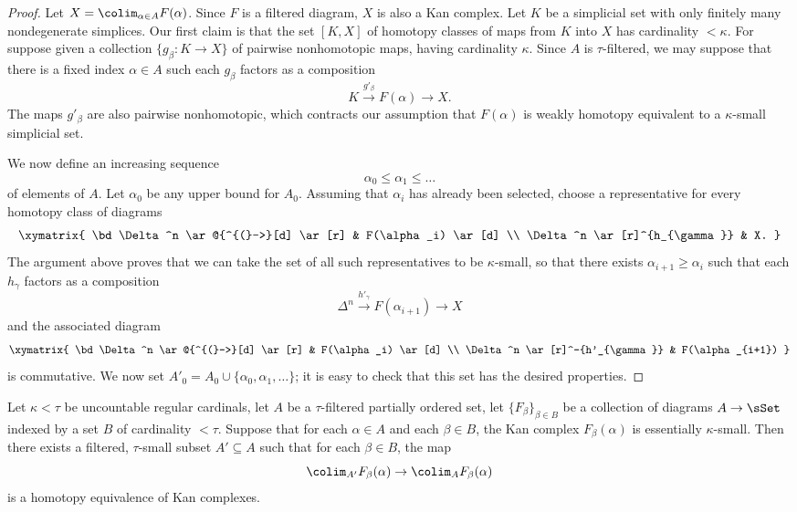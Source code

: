 \begin{proof}
Let $X = \colim_{\alpha \in A} F(\alpha)$. Since $F$ is a filtered diagram, $X$ is also a Kan complex. 
Let $K$ be a simplicial set with only finitely many nondegenerate simplices. Our first claim is that
the set $[K,X]$ of homotopy classes of maps from $K$ into $X$ has cardinality $< \kappa$. For suppose given a collection $\{ g_{\beta}: K \rightarrow X \}$ of pairwise nonhomotopic maps, having cardinality $\kappa$. Since $A$ is $\tau$-filtered, we may suppose that there
is a fixed index $\alpha \in A$ such each $g_{\beta}$ factors as a composition
$$ K \stackrel{g'_{\beta}}{\rightarrow} F(\alpha) \rightarrow X.$$
The maps $g'_{\beta}$ are also pairwise nonhomotopic, which contracts our assumption that
$F(\alpha)$ is weakly homotopy equivalent to a $\kappa$-small simplicial set. 

We now define an increasing sequence $$\alpha_0 \leq \alpha_1 \leq \ldots $$
of elements of $A$. Let $\alpha_0$ be any upper bound for $A_0$. Assuming that $\alpha_i$ has already been selected, choose a representative for every homotopy class of diagrams
$$ \xymatrix{ \bd \Delta^n \ar@{^{(}->}[d] \ar[r] & F(\alpha_i) \ar[d] \\
\Delta^n \ar[r]^{h_{\gamma}} & X. }$$
The argument above proves that we can take the set of all such representatives to be $\kappa$-small, so that there exists $\alpha_{i+1} \geq \alpha_i$ such that each $h_{\gamma}$ factors
as a composition
$$ \Delta^{n} \stackrel{h'_{\gamma}}{\rightarrow} F(\alpha_{i+1}) \rightarrow X$$
and the associated diagram 
$$ \xymatrix{ \bd \Delta^n \ar@{^{(}->}[d] \ar[r] & F(\alpha_i) \ar[d] \\
\Delta^n \ar[r]^-{h'_{\gamma}} & F(\alpha_{i+1}) }$$
is commutative. We now set $A'_0 = A_0 \cup \{\alpha_0, \alpha_1, \ldots \}$; it is easy to check
that this set has the desired properties.
\end{proof}

\begin{lemma}\label{techycardd}
Let $\kappa < \tau$ be uncountable regular cardinals, let $A$ be a $\tau$-filtered partially ordered set, let $\{ F_{\beta} \}_{\beta \in B}$ be a collection of diagrams $A \rightarrow \sSet$ indexed by
a set $B$ of cardinality $< \tau$. Suppose that for each $\alpha \in A$ and each
$\beta \in B$, the Kan complex $F_{\beta}(\alpha)$ is essentially $\kappa$-small.
Then there exists a filtered, $\tau$-small subset
$A' \subseteq A$ such that for each $\beta \in B$, the map
$$ \colim_{A'} F_{\beta}(\alpha) \rightarrow \colim_{A} F_{\beta}(\alpha)$$
is a homotopy equivalence of Kan complexes.
\end{lemma}


